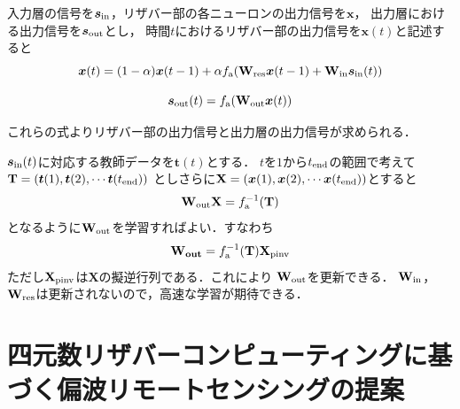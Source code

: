 \documentclass[uplatex,a4paper,12pt]{jsarticle}
\begin{document}
入力層の信号を$\bm{s}_{\rm{in}}$，リザバー部の各ニューロンの出力信号を$\bm{x}$，
出力層における出力信号を$\bm{s}_{\rm{out}}$とし，
時間$t$におけるリザバー部の出力信号を$\bm{x}(t)$と記述すると
\begin{equation}\label{equa:5}
    \bm{x}(t) = (1-\alpha)\bm{x}(t-1)+\alpha f_{\rm{a}}(\mathbf{W_{\rm{res}}} \bm{x}(t-1) + \mathbf{W}_{\rm{in}} \bm{s}_{\rm{in}}(t))
\end{equation}

\begin{equation}\label{equa:6}
    \bm{s}_{\rm{out}}(t) = f_{\rm{a}}(\mathbf{W}_{\rm{out}} \bm{x}(t))
\end{equation}

これらの式よりリザバー部の出力信号と出力層の出力信号が求められる．

$\bm{s}_{\rm{in}}(t)$に対応する教師データを$\bm{t}(t)$とする．
$t$を$1$から$t_{\rm{end}}$の範囲で考えて
$\mathbf{T}=(\bm{t}(1), \bm{t}(2), \cdots \bm{t}(t_{\rm{end}}))$
としさらに$\mathbf{X}=(\bm{x}(1), \bm{x}(2), \cdots \bm{x}(t_{\rm{end}}))$とすると
\begin{equation}\label{equa:7}
    \mathbf{W}_{\rm{out}} \mathbf{X} = f_{\rm{a}}^{-1}(\mathbf{T})
\end{equation}
となるように$\mathbf{W}_{\rm{out}}$を学習すればよい．すなわち
\begin{equation}\label{equa:8}
    \mathbf{W_{out}}=f_{\rm{a}}^{-1}(\mathbf{T}) \mathbf{X}_{\rm{pinv}}
\end{equation}
ただし$\mathbf{X}_{\rm{pinv}}$は$\mathbf{X}$の擬逆行列である．これにより
$\bf{W}_{\rm{out}}$を更新できる．
$\bf{W}_{\rm{in}}$，$\bf{W}_{\rm{res}}$は更新されないので，高速な学習が期待できる．


\section{四元数リザバーコンピューティングに基づく偏波リモートセンシングの提案}
\end{document}
